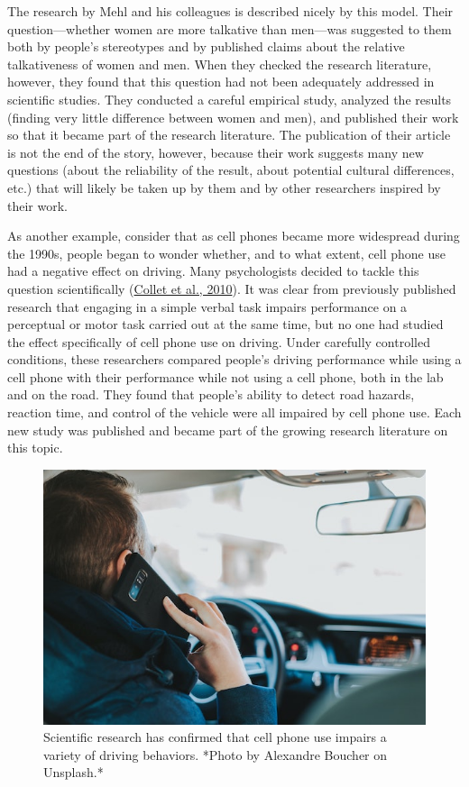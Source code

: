 \documentclass[
]{krantz}
\begin{document}
The research by Mehl and his colleagues is described nicely by this model. Their question---whether women are more talkative than men---was suggested to them both by people's stereotypes and by published claims about the relative talkativeness of women and men. When they checked the research literature, however, they found that this question had not been adequately addressed in scientific studies. They conducted a careful empirical study, analyzed the results (finding very little difference between women and men), and published their work so that it became part of the research literature. The publication of their article is not the end of the story, however, because their work suggests many new questions (about the reliability of the result, about potential cultural differences, etc.) that will likely be taken up by them and by other researchers inspired by their work.

As another example, consider that as cell phones became more widespread during the 1990s, people began to wonder whether, and to what extent, cell phone use had a negative effect on driving. Many psychologists decided to tackle this question scientifically (\protect\hyperlink{ref-collet2010phoning}{Collet et al., 2010}). It was clear from previously published research that engaging in a simple verbal task impairs performance on a perceptual or motor task carried out at the same time, but no one had studied the effect specifically of cell phone use on driving. Under carefully controlled conditions, these researchers compared people's driving performance while using a cell phone with their performance while not using a cell phone, both in the lab and on the road. They found that people's ability to detect road hazards, reaction time, and control of the vehicle were all impaired by cell phone use. Each new study was published and became part of the growing research literature on this topic.

\begin{figure}

{\centering \includegraphics[width=0.5\linewidth]{images/science-of-psych/cell} 

}

\caption{Scientific research has confirmed that cell phone use impairs a variety of driving behaviors. *Photo by Alexandre Boucher on Unsplash.*}\label{fig:cell}
\end{figure}
\end{document}
